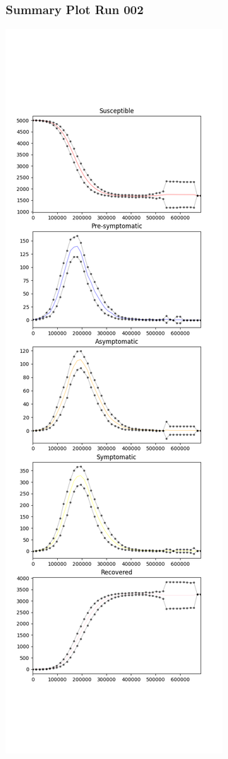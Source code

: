 \documentclass{article}
\begin{document}
\subsubsection{Summary Plot Run 002}
\includegraphics[scale=0.4]{plot_summary_run_002.png}
\end{document}
